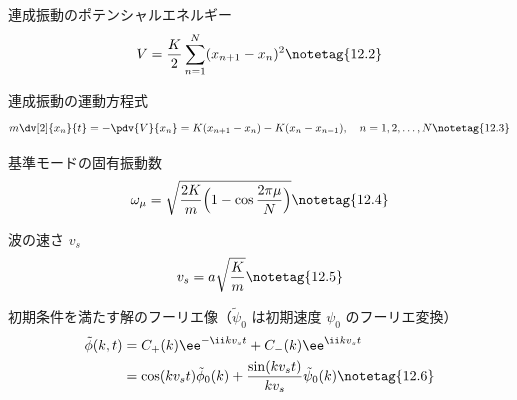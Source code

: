 \documentclass[uplatex,dvipdfmx,a4paper,11pt]{jsarticle}
\begin{document}
\begin{kirokuichiran}
\end{kirokuichiran}

\youtenseiri
\begin{noteshikilist}
  \item 連成振動のポテンシャルエネルギー %
    \[ V=\frac{K}{2}\sum_{n=1}^{N}(x_{n+1}-x_n)^{2} \notetag{12.2} \]
  \item 連成振動の運動方程式 %
    \[ m\dv[2]{x_n}{t}=-\pdv{V}{x_n}=K(x_{n+1}-x_n)-K(x_n-x_{n-1}),\quad n=1,2,\dots,N \notetag{12.3} \]
  \item 基準モードの固有振動数 %
    \[ \omega_\mu=\sqrt{\frac{2K}{m}\Bigl(1-\cos\frac{2\pi\mu}{N}\Bigr)} \notetag{12.4} \]
  \item 波の速さ $v_s$ %
    \[ v_s=a\sqrt{\frac{K}{m}} \notetag{12.5} \]
  \item 初期条件を満たす解のフーリエ像（$\tilde{\psi}_0$ は初期速度 $\psi_0$ のフーリエ変換） %
    \begin{align*}
      \tilde{\phi}(k,t)&=C_+(k)\ee^{-\ii kv_st}+C_-(k)\ee^{\ii kv_st}\\
      &=\cos(kv_st)\tilde{\phi}_0(k)+\frac{\sin(kv_st)}{kv_s}\tilde{\psi}_0(k) \notetag{12.6}
    \end{align*}
\end{noteshikilist}
\end{document}
